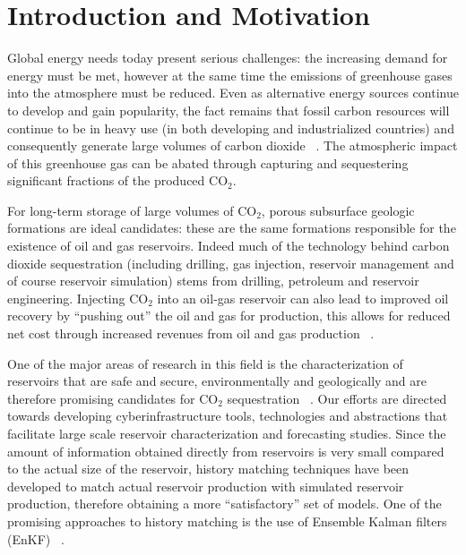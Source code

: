 \documentclass{acm_proc_article-sp}
\begin{document}



\section{Introduction and Motivation}

Global energy needs today present serious challenges: the increasing
demand for energy must be met, however at the same time the emissions
of greenhouse gases into the atmosphere must be reduced. Even as
alternative energy sources continue to develop and gain popularity,
the fact remains that fossil carbon resources will continue to be in
heavy use (in both developing and industrialized countries) and
consequently generate large volumes of carbon dioxide
~\cite{GeoRPT}. The atmospheric impact of this greenhouse gas can be
abated through capturing and sequestering significant fractions of the
produced CO$_2$.

For long-term storage of large volumes of CO$_2$, porous subsurface
geologic formations are ideal candidates: these are the same
formations responsible for the existence of oil and gas
reservoirs. Indeed much of the technology behind carbon dioxide
sequestration (including drilling, gas injection, reservoir management
and of course reservoir simulation) stems from drilling, petroleum and
reservoir engineering. Injecting CO$_2$ into an oil-gas reservoir can
also lead to improved oil recovery by ``pushing out'' the oil and gas
for production, this allows for reduced net cost through increased
revenues from oil and gas production ~\cite{EORBook}.

One of the major areas of research in this field is the
characterization of reservoirs that are safe and secure,
environmentally and geologically and are therefore promising
candidates for CO$_2$ sequestration ~\cite{GeoRPT,Luigi}. Our efforts
are directed towards developing cyberinfrastructure tools,
technologies and abstractions that facilitate large scale reservoir
characterization and forecasting studies.  Since the amount of
information obtained directly from reservoirs is very small compared
to the actual size of the reservoir, history matching techniques have
been developed to match actual reservoir production with simulated
reservoir production, therefore obtaining a more ``satisfactory'' set
of models. One of the promising approaches to history matching is the
use of Ensemble Kalman filters (EnKF) ~\cite{KalmanPaper, DO2007,
  LiEnKF07, DO2006}. 
\end{document}
